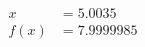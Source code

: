 \documentclass[preview]{standalone}
\begin{document}
\begin{align*}
x &= 5.0035\\f(x) &= 7.9999985
\end{align*}
\end{document}
